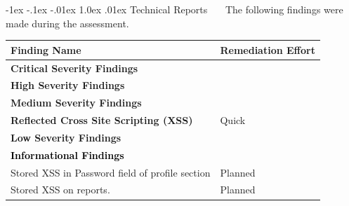 \documentclass{article}
\makeatletter
\renewcommand{\section}{\@startsection{section}{1}{\z@}%
            {-1ex \@plus -.1ex \@minus -.01ex}%
            {1.0ex \@plus  .01ex}%
            {\normalfont\large\bfseries\color{sectioncolor}}}
\makeatother
\begin{document}
            
            \newpage
            \section{\large Technical Reports}
            \ \ \ The following findings were made during the assessment.    
            \begin{center}
                \begin{longtable}{|p{30em}|p{10em}|}
            \hline
            \textbf{Finding Name} & \textbf{Remediation Effort}  \\
            \hline
            \normalsize \textcolor{critical}{\textbf{Critical Severity Findings}} & \\
            \hline
            \multicolumn{2}{|p{20em}|}{\normalsize \textcolor{high}{\textbf{High Severity Findings}}} \\
            \hline
            \multicolumn{2}{|p{20em}|}{\normalsize \textcolor{medium}{\textbf{Medium Severity Findings}}} \\
            \hline
            \normalsize \textbf{Reflected Cross Site Scripting (XSS) } & {Quick}\\
            \hline
            \multicolumn{2}{|p{20em}|}{\normalsize \textcolor{low}{\textbf{Low Severity Findings}}} \\
            \hline
            \multicolumn{2}{|p{20em}|}{\normalsize \textcolor{infotext}{\textbf{Informational Findings}}} \\
            \hline
            
                    Stored XSS in Password field of profile section	 & Planned \\
                    \hline
                    Stored XSS on reports. & Planned \\
                    \hline\end{longtable}
            \end{center}
            
                    \newpage
\end{document}
